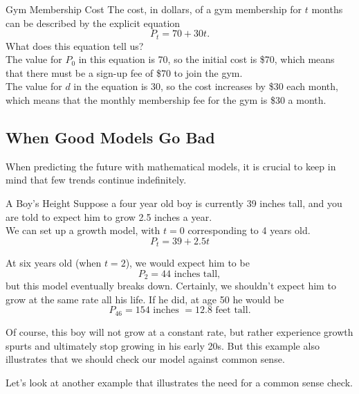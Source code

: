 \begin{example}[https://www.youtube.com/watch?v=3GG3aOIc9Pk]{Gym Membership Cost}
The cost, in dollars, of a gym membership for $t$ months can be described by the explicit equation
\[P_t = 70 + 30t.\]
What does this equation tell us?\\

The value for $P_0$ in this equation is 70, so the initial cost is \$70, which means that there must be a sign-up fee of \$70 to join the gym.\\

The value for $d$ in the equation is 30, so the cost increases by \$30 each month, which means that the monthly membership fee for the gym is \$30 a month.
\end{example}

\subsection{When Good Models Go Bad}
When predicting the future with mathematical models, it is crucial to keep in mind that few trends continue indefinitely.

\begin{example}[https://www.youtube.com/watch?v=7_wAlvsCyDc]{A Boy's Height}
Suppose a four year old boy is currently 39 inches tall, and you are told to expect him to grow 2.5 inches a year.\\

We can set up a growth model, with $t=0$ corresponding to 4 years old.
\[P_t = 39 + 2.5t\]

At six years old (when $t=2$), we would expect him to be
\[P_2 = 44 \textrm{ inches tall},\]
but this model eventually breaks down.  Certainly, we shouldn't expect him to grow at the same rate all his life.  If he did, at age 50 he would be
\[P_{46} = 154 \textrm{ inches } = 12.8 \textrm{ feet tall}.\]
\end{example}

Of course, this boy will not grow at a constant rate, but rather experience growth spurts and ultimately stop growing in his early 20s.  But this example also illustrates that we should check our model against common sense.
\vspace{0.5in}

Let's look at another example that illustrates the need for a common sense check.

